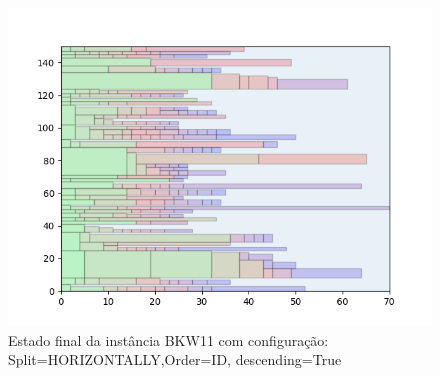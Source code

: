 \begin{figure}[H]
    \centering
    \caption[]{Estado final da instância BKW11 com configuração: Split=HORIZONTALLY,Order=ID, descending=True}
    \label{fig:bkw11-horizontally-id-true}
    \includegraphics[scale=0.5]{output/figures/bkw/bkw11/horizontally/id/true/000}
\end{figure}